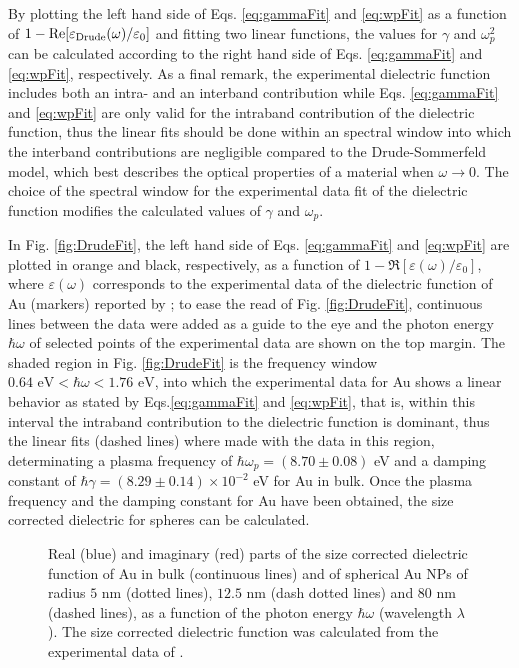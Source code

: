 By plotting the left hand side of Eqs. \eqref{eq:gammaFit} and \eqref{eq:wpFit} as a function of  $1-\Re[\varepsilon_\text{\scriptsize Drude}(\omega)/\varepsilon_0]$ and fitting two linear functions, the values for $\gamma$ and $\omega_p^2$ can be calculated according to the right hand side of Eqs. \eqref{eq:gammaFit} and \eqref{eq:wpFit}, respectively. As a final remark, the experimental dielectric function includes both an intra- and an interband contribution  while  Eqs. \eqref{eq:gammaFit} and \eqref{eq:wpFit} are only valid for the intraband contribution of the dielectric function, thus the linear fits should be done within an spectral window into which the interband contributions are negligible compared to the Drude-Sommerfeld model, which best describes the optical properties of a material  when $\omega\to 0$. The  choice of the spectral window for the experimental data fit of the dielectric function modifies the calculated values of $\gamma$ and $\omega_p$.

 In Fig. \ref{fig:DrudeFit}, the left hand side of Eqs. \eqref{eq:gammaFit}  and \eqref{eq:wpFit} are plotted in orange and black, respectively, as a function of $1-\Re[\varepsilon(\omega)/ \varepsilon_0]$, where $\varepsilon(\omega)$  corresponds to the experimental data of the dielectric function of Au (markers) reported by \citeauthor{johnson_optical_1972} \cite{johnson_optical_1972}; to ease the read of Fig. \ref{fig:DrudeFit}, continuous lines between the data were added as a guide to the eye and the photon energy $\hbar\omega$ of selected points of the experimental data are shown on the top margin. The shaded region in Fig. \ref{fig:DrudeFit} is the frequency window $0.64\text{ eV} < \hbar\omega < 1.76 \text{ eV}$, into which the experimental data for Au shows a linear behavior as stated by Eqs.\eqref{eq:gammaFit}  and \eqref{eq:wpFit}, that is, within this interval  the intraband contribution to the dielectric function is dominant, thus the linear fits (dashed lines) where made with the data in this region, determinating a plasma frequency of $\hbar\omega_p =(8.70\pm0.08)$ eV and a damping constant of $\hbar\gamma = (8.29 \pm 0.14)\times 10^{-2}$ eV for Au in bulk. Once the plasma frequency and the damping constant for Au have been obtained, the size corrected dielectric for spheres can be calculated.

   \begin{figure}[h!]
   \def\svgwidth{.85\textwidth} \centering \small
   \caption[Au size corrected dielectric function]{ Real (blue) and imaginary (red) parts of the size corrected dielectric function of Au in bulk (continuous lines) and  of spherical Au NPs of radius $5$ nm (dotted lines), $12.5$ nm (dash dotted lines) and $80$ nm (dashed lines), as a function of the photon energy $\hbar\omega$ (wavelength $\lambda$). The size corrected dielectric function was calculated from the experimental data of \citeauthor{johnson_optical_1972} \cite{johnson_optical_1972}. }
   \label{fig:EpsSize}
   \end{figure}

